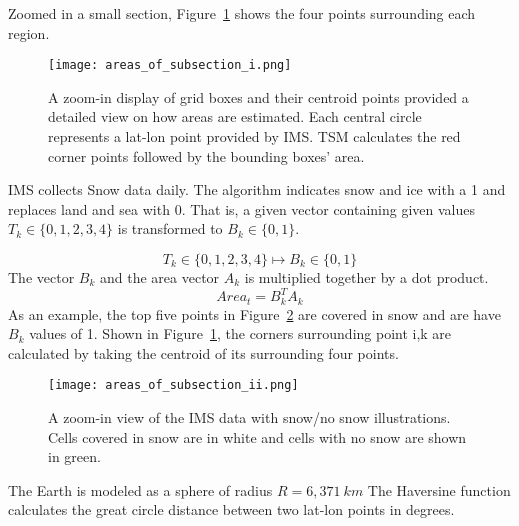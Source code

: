 Zoomed in a small section, Figure~\ref{fig:areas_section} shows the four points surrounding each region.

\begin{figure}[ht]
\centering
\begin{minipage}{6in}
\texttt{[image: areas\_of\_subsection\_i.png]}
\caption{A zoom-in display of grid boxes and their centroid points provided a detailed view on how areas are estimated. Each central circle represents a lat-lon point provided by IMS. TSM calculates the red corner points followed by the bounding boxes' area.}
\label{fig:areas_section}
\end{minipage}
\end{figure}

IMS collects Snow data daily. The algorithm indicates snow and ice with a 1 and replaces land and sea with 0. That is, a given vector containing given values $T_k \in \{0,1,2,3,4\}$ is transformed to $B_k \in \{0,1\}$.

\begin{equation}
T_k \in \{0,1,2,3,4\} \mapsto B_k \in \{0,1\}
\end{equation}
The vector $B_k$ and the area vector $A_k$ is multiplied together by a dot product.
\begin{equation}
Area_t  = B_k^{T}A_k
\end{equation}
As an example, the top five points in Figure~\ref{fig:areas_section_ii} are covered in snow and are have $B_k$ values of 1. Shown in Figure~\ref{fig:areas_section}, the corners surrounding point i,k are calculated by taking the centroid of its surrounding four points.

\begin{figure}[ht]
\centering
\begin{minipage}{6in}
\texttt{[image: areas\_of\_subsection\_ii.png]}
\caption{A zoom-in view of the IMS data with snow/no snow illustrations. Cells covered in snow are in white and cells with no snow are shown in green.}
\label{fig:areas_section_ii}
\end{minipage}
\end{figure}


The Earth is modeled as a sphere of radius $R = 6,371 \ km$ The Haversine function calculates the great circle distance between two lat-lon points in degrees.

